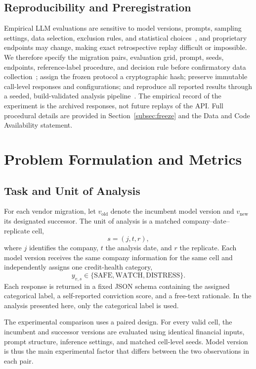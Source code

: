 \documentclass[11pt]{article}
\begin{document}
\subsection{Reproducibility and Preregistration}
Empirical LLM evaluations are sensitive to model versions, prompts, sampling settings, data selection, exclusion rules, and statistical choices~\cite{simmons}, and proprietary endpoints may change, making exact retrospective replay difficult or impossible. We therefore specify the migration pairs, evaluation grid, prompt, seeds, endpoints, reference-label procedure, and decision rule before confirmatory data collection~\cite{nosek}; assign the frozen protocol a cryptographic hash; preserve immutable call-level responses and configurations; and reproduce all reported results through a seeded, build-validated analysis pipeline~\cite{pineau}. The empirical record of the experiment is the archived responses, not future replays of the API. Full procedural details are provided in Section~\ref{subsec:freeze} and the Data and Code Availability statement.

\section{Problem Formulation and Metrics}
\subsection{Task and Unit of Analysis}
For each vendor migration, let $v_{\mathrm{old}}$ denote the incumbent model version and $v_{\mathrm{new}}$ its designated successor. The unit of analysis is a matched company--date--replicate cell,
\begin{equation}
s=(j,t,r),
\end{equation}
where $j$ identifies the company, $t$ the analysis date, and $r$ the replicate. Each model version receives the same company information for the same cell and independently assigns one credit-health category,
\begin{equation}
y_{v,s}\in\{\text{SAFE},\text{WATCH},\text{DISTRESS}\}.
\end{equation}
Each response is returned in a fixed JSON schema containing the assigned categorical label, a self-reported conviction score, and a free-text rationale. In the analysis presented here, only the categorical label is used.

The experimental comparison uses a paired design. For every valid cell, the incumbent and successor versions are evaluated using identical financial inputs, prompt structure, inference settings, and matched cell-level seeds. Model version is thus the main experimental factor that differs between the two observations in each pair.
\end{document}
